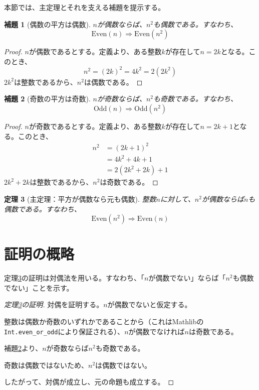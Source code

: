 \documentclass[uplatex, a4paper]{jlreq}
\newtheorem{theorem}{定理}[section]
\newtheorem{lemma}[theorem]{補題}
\begin{document}
本節では、主定理とそれを支える補題を提示する。

\begin{lemma}[偶数の平方は偶数]\label{lem:even_square}
$n$が偶数ならば、$n^2$も偶数である。すなわち、
\[
\text{Even}(n) \Rightarrow \text{Even}(n^2)
\]
\end{lemma}

\begin{proof}
$n$が偶数であるとする。定義より、ある整数$k$が存在して$n = 2k$となる。このとき、
\[
n^2 = (2k)^2 = 4k^2 = 2(2k^2)
\]
$2k^2$は整数であるから、$n^2$は偶数である。
\end{proof}

\begin{lemma}[奇数の平方は奇数]\label{lem:odd_square}
$n$が奇数ならば、$n^2$も奇数である。すなわち、
\[
\text{Odd}(n) \Rightarrow \text{Odd}(n^2)
\]
\end{lemma}

\begin{proof}
$n$が奇数であるとする。定義より、ある整数$k$が存在して$n = 2k + 1$となる。このとき、
\begin{align}
n^2 &= (2k + 1)^2 \\
    &= 4k^2 + 4k + 1 \\
    &= 2(2k^2 + 2k) + 1
\end{align}
$2k^2 + 2k$は整数であるから、$n^2$は奇数である。
\end{proof}

\begin{theorem}[主定理：平方が偶数なら元も偶数]\label{thm:main}
整数$n$に対して、$n^2$が偶数ならば$n$も偶数である。すなわち、
\[
\text{Even}(n^2) \Rightarrow \text{Even}(n)
\]
\end{theorem}

\section{証明の概略}

定理\ref{thm:main}の証明は対偶法を用いる。すなわち、「$n$が偶数でない」ならば「$n^2$も偶数でない」ことを示す。

\begin{proof}[定理\ref{thm:main}の証明]
対偶を証明する。$n$が偶数でないと仮定する。

整数は偶数か奇数のいずれかであることから（これはMathlibの\texttt{Int.even\_or\_odd}により保証される）、$n$が偶数でなければ$n$は奇数である。

補題\ref{lem:odd_square}より、$n$が奇数ならば$n^2$も奇数である。

奇数は偶数ではないため、$n^2$は偶数ではない。

したがって、対偶が成立し、元の命題も成立する。
\end{proof}
\end{document}
